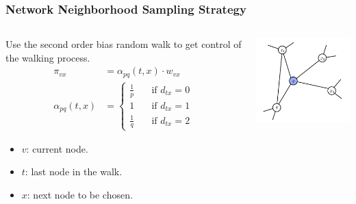 \documentclass[10pt, aspectratio=169]{beamer}
\begin{document}
\begin{frame}
    \frametitle{Network Neighborhood Sampling Strategy}
    \begin{columns}
        \begin{column}{0.5\textwidth}
         Use the second order bias random walk to get control of the walking process.
         \begin{align*}
             \pi_{vx} &= \alpha_{pq}\left( t, x \right) \cdot w_{vx}\\
             \alpha_{pq}\left( t, x \right) &=
             \begin{cases}
                 \frac{1}{p}\quad & \text{if } d_{tx} = 0\\
                 1\quad & \text{if } d_{tx} = 1\\
                 \frac{1}{q}\quad & \text{if } d_{tx} = 2
             \end{cases}
         \end{align*}
         \begin{itemize}
             \item[] $v$: current node.
             \item[] $t$: last node in the walk.
             \item[] $x$: next node to be chosen.
         \end{itemize}
        \end{column}
        \begin{column}{0.5\textwidth}
           \begin{center}
               \includegraphics[width=5cm]{./graphics/graphexample.png}
           \end{center} 
        \end{column}
    \end{columns}
\end{frame}
\end{document}
